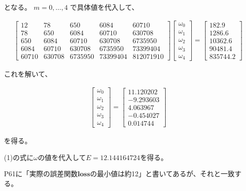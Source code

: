 \documentclass{jsarticle}
\begin{document}
となる。
$m=0, \dots , 4$ で具体値を代入して、

\begin{align*}
	\begin{bmatrix}
    12 & 78 & 650 & 6084 & 60710 \\
	78 & 650 & 6084 & 60710 & 630708 \\
	650 & 6084 & 60710 & 630708 & 6735950 \\
	6084 & 60710 & 630708 & 6735950 & 73399404 \\
	60710 & 630708 & 6735950 & 73399404 & 812071910
	\end{bmatrix}
	\begin{bmatrix}
		\omega_0 \\
		\omega_1 \\
		\omega_2 \\
		\omega_3 \\
		\omega_4 
	\end{bmatrix}
	=
	\begin{bmatrix}
		182.9 \\
		1286.6 \\
		10362.6 \\
		90481.4 \\
		835744.2
	\end{bmatrix}
\end{align*}

これを解いて、

\begin{align*}
	\begin{bmatrix}
		\omega_0 \\
		\omega_1 \\
		\omega_2 \\
		\omega_3 \\
		\omega_4 
	\end{bmatrix}
	=
	\begin{bmatrix}
		11.120202 \\
		-9.293603 \\
		4.063967 \\
		-0.454027 \\
		0.014744
	\end{bmatrix}
\end{align*}

を得る。

(1)の式に$\omega$の値を代入して$E=12.144164724$を得る。

P61に「実際の誤差関数$ \bm{loss} $の最小値は約12」と書いてあるが、それと一致する。
\end{document}
